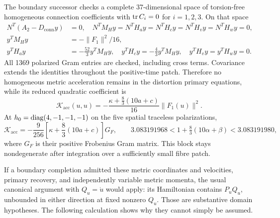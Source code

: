 The boundary successor \cite{Boundary} checks a complete 37-dimensional
space of torsion-free homogeneous connection coefficients with
$\operatorname{tr} C_i=0$ for $i=1,2,3$. On that space
\begin{align}
 N^T(A_2-D_{\mathrm{conn}}y)&=0,\quad
 N^TM_Hy=N^TH_ay=N^TH_cy=N^TH_vy=N^TH_wy=0,\nonumber\\
 y^TM_Hy&=-\|F_1\|^2/16,\nonumber\\
 y^TH_ay&=-\tfrac{52}{3}y^TM_Hy,\quad
 y^TH_cy=-\tfrac43y^TM_Hy,\quad y^TH_vy=y^TH_wy=0.
 \label{eq:universal-acc}
\end{align}
All 1369 polarized Gram entries are checked, including cross terms.
Covariance extends the identities throughout the positive-time patch.
Therefore no homogeneous metric acceleration remains in the distortion
primary equations, while its reduced quadratic coefficient is
\begin{equation}
 \mathcal K_{\mathrm{acc}}(u,u)=
 -\frac{\kappa+\frac83(10a+c)}{16}\|F_1(u)\|^2.
 \label{eq:acceleration}
\end{equation}
At $h_0=\operatorname{diag}(4,-1,-1,-1)$ on the five spatial traceless polarizations,
\begin{equation}
 \mathcal K_{\mathrm{acc}}=
 -\frac9{256}\left[\kappa+\frac83(10a+c)\right]G_F,
 \qquad
 3.083191968<1+\tfrac83(10\alpha+\beta)<3.083191980,
 \label{eq:acc-five}
\end{equation}
where $G_F$ is their positive Frobenius Gram matrix. This block stays
nondegenerate after integration over a sufficiently small fibre patch.

If a boundary completion admitted these metric coordinates and velocities,
primary recovery, and independently variable metric momenta, the usual
canonical argument with $Q_u=\dot u$ would apply: its Hamiltonian contains
$P_uQ_u$, unbounded in either direction at fixed nonzero $Q_u$.
Those are substantive domain hypotheses. The following calculation shows
why they cannot simply be assumed.

